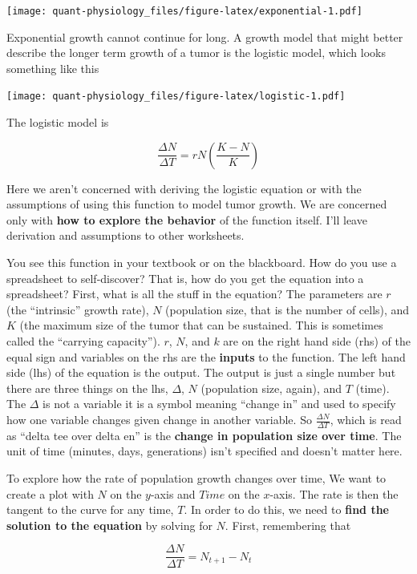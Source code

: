 \documentclass[]{book}
\begin{document}
\texttt{[image: quant-physiology\_files/figure-latex/exponential-1.pdf]}

Exponential growth cannot continue for long. A growth model that might
better describe the longer term growth of a tumor is the logistic model,
which looks something like this

\texttt{[image: quant-physiology\_files/figure-latex/logistic-1.pdf]}

The logistic model is

\begin{equation}
\frac{\Delta N}{\Delta T} = rN(\frac{K-N}{K})
\end{equation}

Here we aren't concerned with deriving the logistic equation or with the
assumptions of using this function to model tumor growth. We are
concerned only with \textbf{how to explore the behavior} of the function
itself. I'll leave derivation and assumptions to other worksheets.

You see this function in your textbook or on the blackboard. How do you
use a spreadsheet to self-discover? That is, how do you get the equation
into a spreadsheet? First, what is all the stuff in the equation? The
parameters are \(r\) (the ``intrinsic'' growth rate), \(N\) (population
size, that is the number of cells), and \(K\) (the maximum size of the
tumor that can be sustained. This is sometimes called the ``carrying
capacity''). \(r\), \(N\), and \(k\) are on the right hand side (rhs) of
the equal sign and variables on the rhs are the \textbf{inputs} to the
function. The left hand side (lhs) of the equation is the output. The
output is just a single number but there are three things on the lhs,
\(\Delta\), \(N\) (population size, again), and \(T\) (time). The
\(\Delta\) is not a variable it is a symbol meaning ``change in'' and
used to specify how one variable changes given change in another
variable. So \(\frac{\Delta N}{\Delta T}\), which is read as ``delta tee
over delta en'' is the \textbf{change in population size over time}. The
unit of time (minutes, days, generations) isn't specified and doesn't
matter here.

To explore how the rate of population growth changes over time, We want
to create a plot with \(N\) on the \(y\)-axis and \(Time\) on the
\(x\)-axis. The rate is then the tangent to the curve for any time,
\(T\). In order to do this, we need to \textbf{find the solution to the
equation} by solving for \(N\). First, remembering that

\begin{equation}
\frac{\Delta N}{\Delta T} = N_{t+1} - N_t
\end{equation}
\end{document}
